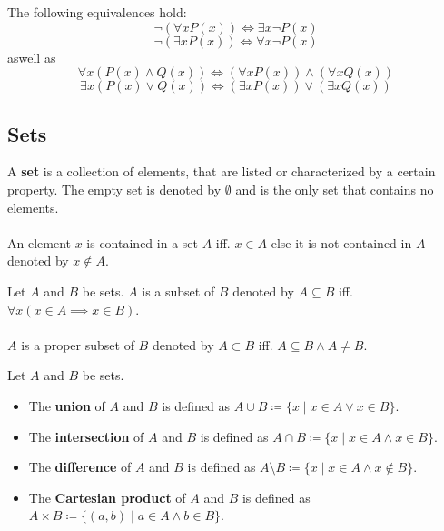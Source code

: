 \begin{theorem}
The following equivalences hold:
$$\neg (\forall x P(x)) \iff \exists x \neg P(x)$$
$$\neg (\exists x P(x)) \iff \forall x \neg P(x)$$
aswell as
$$\forall x (P(x) \land Q(x)) \iff (\forall x P(x)) \land (\forall x Q(x))$$
$$\exists x (P(x) \lor Q(x)) \iff (\exists x P(x)) \lor (\exists x Q(x))$$
\end{theorem}

\subsection{Sets}

\begin{definition}
A \textbf{set} is a collection of elements, that are listed or characterized by a certain property. 
The empty set is denoted by $\emptyset$ and is the only set that contains no elements.
\\ \\
An element $x$ is contained in a set $A$ iff. $x \in A$ else it is not contained in $A$ denoted by $x \notin A$.
\end{definition}

\begin{definition}
Let $A$ and $B$ be sets. $A$ is a subset of $B$ denoted by $A \subseteq B$ iff. $\forall x (x \in A \implies x \in B)$.
\\ \\
$A$ is a proper subset of $B$ denoted by $A \subset B$ iff. $A \subseteq B \land A \neq B$.
\end{definition}

\begin{definition}
Let $A$ and $B$ be sets.
\begin{itemize}
    \item The \textbf{union} of $A$ and $B$ is defined as $A \cup B \coloneqq \{x \mid x \in A \lor x \in B\}$.
    \item The \textbf{intersection} of $A$ and $B$ is defined as $A \cap B \coloneqq \{x \mid x \in A \land x \in B\}$.
    \item The \textbf{difference} of $A$ and $B$ is defined as $A \setminus B \coloneqq \{x \mid x \in A \land x \notin B\}$.
    \item The \textbf{Cartesian product} of $A$ and $B$ is defined as $A \times B \coloneqq \{(a, b) \mid a \in A \land b \in B\}$.
\end{itemize}
\end{definition}

